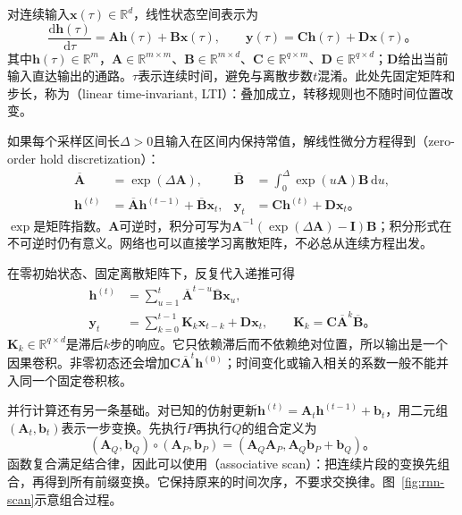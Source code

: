 对连续输入$\bm{x}(\tau)\in\mathbb{R}^{d}$，线性状态空间表示为
\begin{equation}
  \frac{\mathrm{d}\bm{h}(\tau)}{\mathrm{d}\tau}
    =\bm{A}\bm{h}(\tau)+\bm{B}\bm{x}(\tau),
  \qquad
  \bm{y}(\tau)=\bm{C}\bm{h}(\tau)+\bm{D}\bm{x}(\tau)\text{。}
  \label{eq:rnn-continuous-ssm}
\end{equation}
其中$\bm{h}(\tau)\in\mathbb{R}^{m}$，$\bm{A}\in\mathbb{R}^{m\times m}$、$\bm{B}\in\mathbb{R}^{m\times d}$、$\bm{C}\in\mathbb{R}^{q\times m}$、$\bm{D}\in\mathbb{R}^{q\times d}$；$\bm{D}$给出当前输入直达输出的通路。$\tau$表示连续时间，避免与离散步数$t$混淆。此处先固定矩阵和步长，称为（linear time-invariant, LTI）：叠加成立，转移规则也不随时间位置改变。

如果每个采样区间长$\Delta>0$且输入在区间内保持常值，解线性微分方程得到（zero-order hold discretization）：
\begin{equation}
  \begin{aligned}
    \overline{\bm{A}}&=\exp(\Delta\bm{A}),
    &\overline{\bm{B}}&=\int_0^{\Delta}\exp(u\bm{A})\bm{B}\,\mathrm{d}u,\\
    \bm{h}^{(t)}&=\overline{\bm{A}}\bm{h}^{(t-1)}
       +\overline{\bm{B}}\bm{x}_t,
    &\bm{y}_t&=\bm{C}\bm{h}^{(t)}+\bm{D}\bm{x}_t\text{。}
  \end{aligned}
  \label{eq:rnn-ssm-zoh}
\end{equation}
$\exp$是矩阵指数。$\bm{A}$可逆时，积分可写为$\bm{A}^{-1}(\exp(\Delta\bm{A})-\bm{I})\bm{B}$；积分形式在不可逆时仍有意义。网络也可以直接学习离散矩阵，不必总从连续方程出发。

在零初始状态、固定离散矩阵下，反复代入递推可得
\begin{equation}
  \begin{aligned}
    \bm{h}^{(t)}&=\sum_{u=1}^{t}
       \overline{\bm{A}}^{t-u}\overline{\bm{B}}\bm{x}_u,\\
    \bm{y}_t&=\sum_{k=0}^{t-1}\bm{K}_k\bm{x}_{t-k}
       +\bm{D}\bm{x}_t,\qquad
    \bm{K}_k=\bm{C}\overline{\bm{A}}^k\overline{\bm{B}}\text{。}
  \end{aligned}
  \label{eq:rnn-ssm-convolution}
\end{equation}
$\bm{K}_k\in\mathbb{R}^{q\times d}$是滞后$k$步的响应。它只依赖滞后而不依赖绝对位置，所以输出是一个因果卷积。非零初态还会增加$\bm{C}\overline{\bm{A}}^t\bm{h}^{(0)}$；时间变化或输入相关的系数一般不能并入同一个固定卷积核。

并行计算还有另一条基础。对已知的仿射更新$\bm{h}^{(t)}=\bm{A}_t\bm{h}^{(t-1)}+\bm{b}_t$，用二元组$(\bm{A}_t,\bm{b}_t)$表示一步变换。先执行$P$再执行$Q$的组合定义为
\begin{equation}
  (\bm{A}_Q,\bm{b}_Q)\circ(\bm{A}_P,\bm{b}_P)
   =(\bm{A}_Q\bm{A}_P,
      \bm{A}_Q\bm{b}_P+\bm{b}_Q)\text{。}
  \label{eq:rnn-affine-composition}
\end{equation}
函数复合满足结合律，因此可以使用（associative scan）：把连续片段的变换先组合，再得到所有前缀变换。它保持原来的时间次序，不要求交换律。图~\ref{fig:rnn-scan}示意组合过程。

